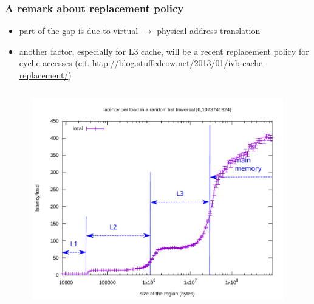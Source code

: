 \documentclass[12pt,dvipdfmx]{beamer}
\begin{document}
\begin{frame}
\frametitle{A remark about replacement policy}
\begin{itemize}

\item part of the gap is due to virtual $\rightarrow$ physical
  address translation

\item another factor, especially for L3 cache, will be
  a recent replacement policy for cyclic accesses
(c.f. \url{http://blog.stuffedcow.net/2013/01/ivb-cache-replacement/})

\begin{columns}
  \begin{column}{0.5\textwidth}
\def\svgwidth{\textwidth}
{\tiny}
  \end{column}  
  \begin{column}{0.5\textwidth}
\includegraphics[width=0.9\textwidth]{out/pdf/svg/latency_cliff.pdf}
  \end{column}
\end{columns}
\end{itemize}
\end{frame}
\end{document}
